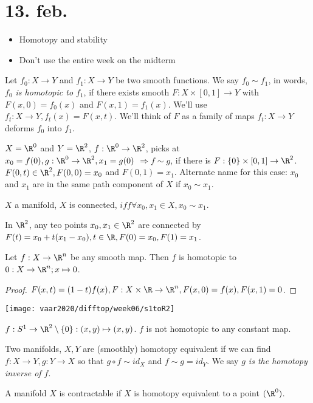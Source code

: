 \section{13. feb.}
\begin{itemize}
  \item Homotopy and stability
  \item Don't use the entire week on the midterm
\end{itemize}
\begin{definition}
  Let $f_0 : X\to Y$ and $f_1: X\to Y$ be two smooth functions. We say $f_0 \sim f_1$, in words, \emph{$f_0$ is homotopic to $f_1$}, if there exists smooth $F: X \times [0,1] \to Y$ with $F(x,0)=f_0(x)$ and $F(x,1)=f_1(x)$. We'll use $f_t : X\to Y, f_t(x)=F(x,t)$. We'll think of $F$ as a family of maps $f_t : X\to Y$ deforms $f_0 $ into $f_1$.
\end{definition}
\begin{example}
  $X=\R^0$ and $Y=\R^2$, $f: \R^0 \to \R^2$, picks at $x_0 = f(0), g: \R^0 \to \R^2, x_1=g(0)$
  \newline $\Rightarrow f\sim g$, if there is $F:\{0\} \times [0,1] \to \R^2$.
  \newline $F(0,t)\in \R^2, F(0,0)=x_0$ and $F(0,1)=x_1$. Alternate name for this case: $x_0$ and $x_1$ are in the same path component of $X$ if $x_0 \sim x_1$.
\end{example}
\begin{exercise}
      $X$ a manifold, $X$ is connected, $iff \forall x_0,x_1 \in X, x_0 \sim x_1$.
\end{exercise}
In $\R^2$, any teo points $x_0, x_1 \in \R^2$ are connected by $F(t)=x_0+t(x_1-x_0), t\in \R, F(0)=x_0, F(1)=x_1$.
\begin{proposition}
  Let $f: X\to \R^n$ be any smooth map. Then $f$ is homotopic to $0: X \to \R^n; x\mapsto 0$.
\end{proposition}
\begin{proof}
  $F(x,t)=(1-t)f(x), F: X\times \R \to \R^n, F(x,0)=f(x), F(x,1)=0$.
\end{proof}
\begin{center}
      \texttt{[image: vaar2020/difftop/week06/s1toR2]}
\end{center}
\begin{example}
  $f:S^1\to \R^2\setminus\{0\}: (x,y)\mapsto (x,y)$.
  \newline $f$ is not homotopic to any constant map.
\end{example}
\begin{definition}
  Two manifolds, $X,Y$ are (smoothly) homotopy equivalent if we can find $f: X\to Y, g:Y \to X$ so that $g\circ f \sim id_X$ and $f \sim g = id_Y$. We say \emph{$g$ is the homotopy inverse of $f$}.
\end{definition}
\begin{definition}
  A manifold $X$ is contractable if $X$ is homotopy equivalent to a point $(\R^0)$.
\end{definition}

